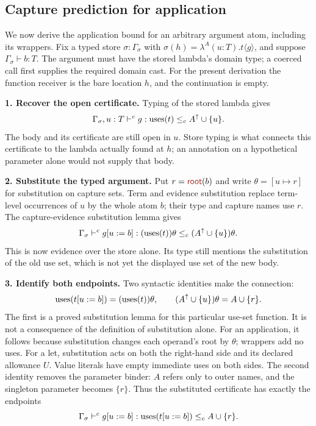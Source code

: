 \FloatBarrier
{}
\subsection*{Capture prediction for application}
\label{sec:app-prediction}
We now derive the application bound for an arbitrary argument atom,
including its wrappers. Fix a typed store $\sigma:\Gamma_\sigma$ with
$\sigma(h)=\lambda^A(u:T).t\langle g\rangle$, and suppose
$\Gamma_\sigma\vdash b:T$. The argument must have the stored lambda's
domain type; a coerced call first supplies the required domain cast.
For the present derivation the function receiver is the bare location
$h$, and the continuation is empty.

\textbf{1. Recover the open certificate.}
Typing of the stored lambda gives
\[
 \Gamma_\sigma,u:T\vdash^c
       g:\operatorname{uses}(t)\le_c A^\uparrow\cup\{u\}.
\]
The body and its certificate are still open in $u$. Store typing is what
connects this certificate to the lambda actually found at $h$; an
annotation on a hypothetical parameter alone would not supply that body.

\textbf{2. Substitute the typed argument.}
Put $r=\ev{root}(b)$ and write $\theta=[u\mapsto r]$ for substitution
on capture sets. Term and evidence substitution replace term-level
occurrences of $u$ by the whole atom $b$; their type and capture names
use $r$. The capture-evidence substitution lemma gives
\[
 \Gamma_\sigma\vdash^c g[u:=b]:
       (\operatorname{uses}(t))\theta\le_c(A^\uparrow\cup\{u\})\theta.
\]
This is now evidence over the store alone. Its type still mentions the
substitution of the old use set, which is not yet the displayed use set
of the new body.

\textbf{3. Identify both endpoints.}
Two syntactic identities make the connection:
\[
 \operatorname{uses}(t[u:=b])=(\operatorname{uses}(t))\theta,\qquad
 (A^\uparrow\cup\{u\})\theta=A\cup\{r\}.
\]
The first is a proved substitution lemma for this particular use-set
function. It is not a consequence of the definition of substitution
alone. For an application, it follows because substitution changes
each operand's root by $\theta$; wrappers add no uses. For a let,
substitution acts on both the right-hand side and its declared allowance
$U$. Value literals have empty immediate uses on both sides.
The second identity removes the parameter binder: $A$ refers only to
outer names, and the singleton parameter becomes $\{r\}$.
Thus the substituted certificate has exactly the endpoints
\[
 \Gamma_\sigma\vdash^c g[u:=b]:
       \operatorname{uses}(t[u:=b])\le_c A\cup\{r\}.
\]


